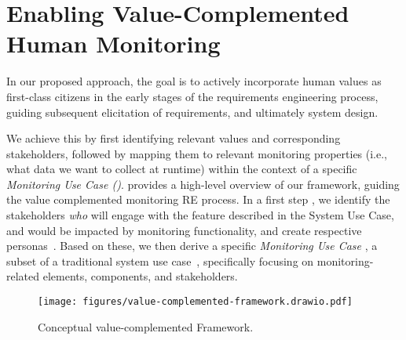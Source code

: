 \section{Enabling Value-Complemented Human Monitoring}
\label{sec:approach}
In our proposed approach, the goal is to actively incorporate human values as first-class citizens in the early stages of the requirements engineering process, guiding subsequent elicitation of requirements, and ultimately system design. 

We achieve this by first identifying relevant values and corresponding stakeholders, followed by mapping them to relevant monitoring properties (i.e., what data we want to collect at runtime) within the context of a specific \emph{Monitoring Use Case (\muc)}.
 provides a high-level overview of our framework, guiding the value complemented monitoring RE process.
In a first step ,  we identify the stakeholders \textit{who} will engage with the feature described in the System Use Case, and would be impacted by monitoring functionality, and create respective personas~\cite{schneidewind2012How}. 
Based on these, we then derive a specific \emph{Monitoring Use Case} , a  subset of a traditional system use case~\cite{yue2013facilitating}, specifically focusing on monitoring-related elements, components, and stakeholders. %


\begin{figure*}[t!]
    \centering
    \texttt{[image: figures/value-complemented-framework.drawio.pdf]}
    \vspace{-10pt}
    \caption{Conceptual value-complemented Framework.}
    \label{fig:value-based-framework}
\end{figure*}



